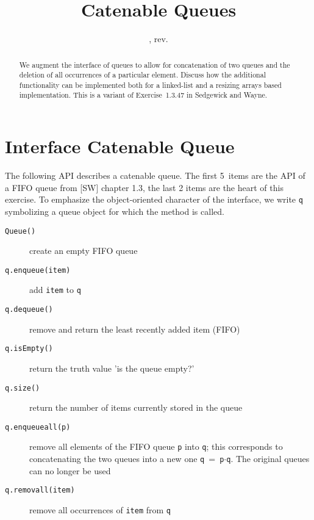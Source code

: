 \documentclass{tufte-handout}
\title{Catenable Queues}
\author{}
\date{\GITAuthorDate, rev. \GITAbrHash}
\begin{document}
\maketitle

\begin{abstract}
  We augment the interface of queues to allow for concatenation of two queues and the deletion of all occurrences of a particular element.
  Discuss how the additional functionality can be implemented both for a linked-list and a resizing arrays based implementation.
  This is a variant of Exercise~1.3.47 in Sedgewick and Wayne.
\end{abstract}

\section{Interface Catenable Queue}

The following API describes a catenable queue. The first 5~items are the API of a FIFO queue from [SW] chapter 1.3, the last 2 items are the heart of this exercise.
To emphasize the object-oriented character of the interface, we write \texttt{q} symbolizing a queue object for which the method is called.
\begin{description}
\item [\texttt{Queue()}] create an empty FIFO queue
\item[\texttt{q.enqueue(item)}] add \texttt{item} to \texttt{q}
\item[\texttt{q.dequeue()}] remove and return the least recently added item (FIFO)
\item[\texttt{q.isEmpty()}] return the truth value 'is the queue empty?'
\item[\texttt{q.size()}] return the number of items currently stored in the queue
\item[\texttt{q.enqueueall(p)}] remove all elements of the FIFO queue \texttt{p} into \texttt{q}; this corresponds to concatenating the two queues into a new one \hbox{\texttt{q} = \texttt{p$\cdot$q}.} The original queues can no longer be used
\item[\texttt{q.removall(item)}] remove all occurrences of \texttt{item} from \texttt{q}
\end{description}
\end{document}

